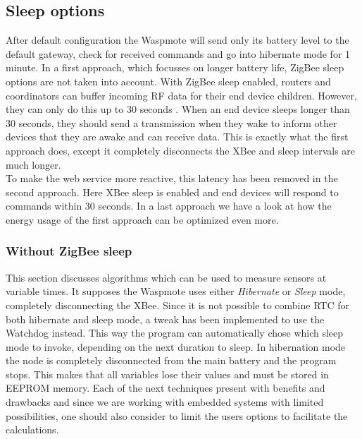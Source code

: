 \subsection{Sleep options}
After default configuration the Waspmote will send only its battery level to the default gateway, check for received commands and go into hibernate mode for 1 minute. In a first approach, which focusses on longer battery life, ZigBee sleep options are not taken into account. With ZigBee sleep enabled, routers and coordinators can buffer incoming RF data for their end device children. However, they can only do this up to 30 seconds . When an end device sleeps longer than 30 seconds, they should send a transmission when they wake to inform other devices that they are awake and can receive data. This is exactly what the first approach does, except it completely disconnects the XBee and sleep intervals are much longer.\\
To make the web service more reactive, this latency has been removed in the second approach. Here XBee sleep is enabled and end devices will respond to commands within 30 seconds.
In a last approach we have a look at how the energy usage of the first approach can be optimized even more.  
\subsubsection{Without ZigBee sleep}
This section discusses algorithms which can be used to measure sensors at variable times. It supposes the Waspmote uses either \textit{Hibernate} or \textit{Sleep} mode, completely disconnecting the XBee. Since it is not possible to combine RTC for both hibernate and sleep mode, a tweak has been implemented to use the Watchdog instead. This way the program can automatically chose which sleep mode to invoke, depending on the next duration to sleep. In hibernation mode the node is completely disconnected from the main battery and the program stops. This makes that all variables lose their values and must be stored in EEPROM memory. Each of the next techniques present with benefits and drawbacks and since we are working with embedded systems with limited possibilities, one should also consider to limit the users options to facilitate the calculations.
